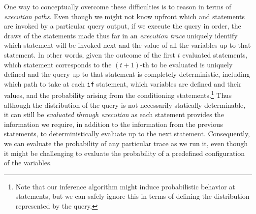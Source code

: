 One way to conceptually overcome these difficulties is to reason in terms of \emph{execution paths}.
Even though we might not know upfront which \sample and \observe statements are invoked by
a particular query output, if we execute the query in order, the draws of the \sample statements made
thus far in an \emph{execution trace} uniquely identify which \sample statement will be invoked next and
the value of all the variables up
to that \sample statement.
In other words, given the outcome of the first $t$ evaluated \sample statements, which \sample statement corresponds
to the $(t+1)$-th to be evaluated is uniquely defined and the query up to that \sample statement is
completely deterministic, including which path to take at each \texttt{if} statement, which variables are defined
and their values, and the probability arising from the \observe conditioning statements.\footnote{Note that our
	inference algorithm might induce probabilistic behavior at \observe statements, but we can safely ignore this
	in terms of defining the distribution represented by the query.}
Thus although the distribution of the query is not necessarily statically
determinable, it can still be \emph{evaluated through execution} as each \sample statement provides
the information we require, in addition to the information from the previous \sample statements, to deterministically evaluate
up to the next \sample statement.
Consequently, we can evaluate the probability of any particular trace as we run it, even though it might
be challenging to evaluate the probability of a predefined configuration of the variables.


